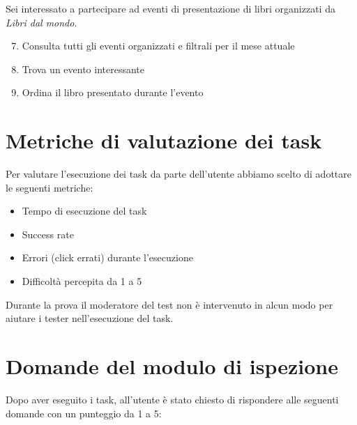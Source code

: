 \documentclass[12pt,a4paper,oneside]{report}
\begin{document}
Sei interessato a partecipare ad eventi di presentazione di libri organizzati da \textit{Libri dal mondo}.\\

\begin{enumerate}
	\setcounter{enumi}{6}
	\item Consulta tutti gli eventi organizzati e filtrali per il mese attuale
	\item Trova un evento interessante
	\item Ordina il libro presentato durante l'evento
\end{enumerate}

\newpage

\section{Metriche di valutazione dei task}

Per valutare l'esecuzione dei task da parte dell'utente abbiamo scelto di adottare le seguenti metriche:

\begin{itemize}
	\item Tempo di esecuzione del task
	\item Success rate
	\item Errori (click errati) durante l'esecuzione
	\item Difficoltà percepita da 1 a 5
\end{itemize}

Durante la prova il moderatore del test non è intervenuto in alcun modo per aiutare i tester nell'esecuzione del task.

\section{Domande del modulo di ispezione}

Dopo aver eseguito i task, all'utente è stato chiesto di rispondere alle seguenti domande con un punteggio da 1 a 5: \\
\end{document}
